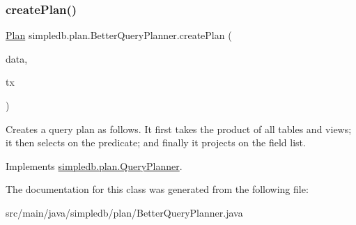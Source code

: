 \subsubsection{\texorpdfstring{create\+Plan()}{createPlan()}}
{\footnotesize\ttfamily \hyperlink{interfacesimpledb_1_1plan_1_1Plan}{Plan} simpledb.\+plan.\+Better\+Query\+Planner.\+create\+Plan (\begin{DoxyParamCaption}\item[{\hyperlink{classsimpledb_1_1parse_1_1QueryData}{Query\+Data}}]{data,  }\item[{\hyperlink{classsimpledb_1_1tx_1_1Transaction}{Transaction}}]{tx }\end{DoxyParamCaption})\hspace{0.3cm}{\ttfamily [inline]}}

Creates a query plan as follows. It first takes the product of all tables and views; it then selects on the predicate; and finally it projects on the field list. 

Implements \hyperlink{interfacesimpledb_1_1plan_1_1QueryPlanner_a3fcc576e66a155bdc11845ec3e95838f}{simpledb.\+plan.\+Query\+Planner}.



The documentation for this class was generated from the following file\+:\begin{DoxyCompactItemize}
\item 
src/main/java/simpledb/plan/Better\+Query\+Planner.\+java\end{DoxyCompactItemize}
